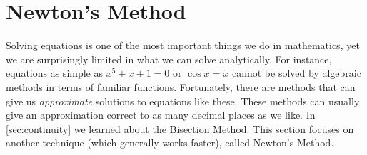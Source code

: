 \section{Newton's Method}\label{sec:newton}

Solving equations is one of the most important things we do in mathematics, yet we are surprisingly limited in what we can solve analytically.  For instance, equations as simple as $x^5+x+1=0$ or $\cos x =x $ cannot be solved by algebraic methods in terms of familiar functions.  Fortunately, there are methods that can give us \textit{approximate} solutions to equations like these.  These methods can usually give an approximation correct to as many decimal places as we like. In \autoref{sec:continuity} we learned about the Bisection Method.  This section focuses on another technique (which generally works faster), called Newton's Method.

